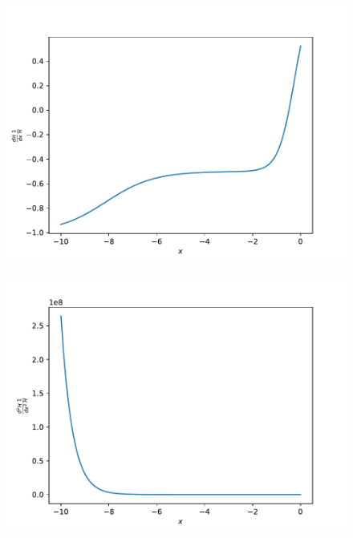 \documentclass{aa}
\begin{document}
\begin{figure}[ht]
\centering
\includegraphics[width=\hsize]{figures/dHpdx_over_Hp.pdf}
  \caption{}
     \label{}
\end{figure}

\begin{figure}[ht]
\centering
\includegraphics[width=\hsize]{figures/ddHpddx_over_Hp.pdf}
  \caption{}
     \label{}
\end{figure}
\end{document}
